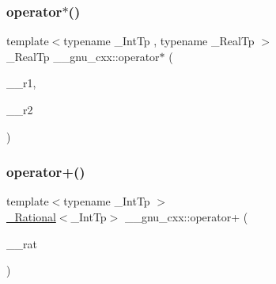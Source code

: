 \subsubsection{\texorpdfstring{operator$\ast$()}{operator*()}\hspace{0.1cm}{\footnotesize\ttfamily [3/3]}}
{\footnotesize\ttfamily template$<$typename \+\_\+\+Int\+Tp , typename \+\_\+\+Real\+Tp $>$ \\
\+\_\+\+Real\+Tp \+\_\+\+\_\+gnu\+\_\+cxx\+::operator$\ast$ (\begin{DoxyParamCaption}\item[{const \hyperlink{class____gnu__cxx_1_1__Rational}{\+\_\+\+Rational}$<$ \+\_\+\+Int\+Tp $>$ \&}]{\+\_\+\+\_\+r1,  }\item[{\+\_\+\+Real\+Tp}]{\+\_\+\+\_\+r2 }\end{DoxyParamCaption})}

\mbox{\label{namespace____gnu__cxx_a047fc1104d5de077fecb75d5917ad254}} 
\subsubsection{\texorpdfstring{operator+()}{operator+()}\hspace{0.1cm}{\footnotesize\ttfamily [1/4]}}
{\footnotesize\ttfamily template$<$typename \+\_\+\+Int\+Tp $>$ \\
\hyperlink{class____gnu__cxx_1_1__Rational}{\+\_\+\+Rational}$<$\+\_\+\+Int\+Tp$>$ \+\_\+\+\_\+gnu\+\_\+cxx\+::operator+ (\begin{DoxyParamCaption}\item[{const \hyperlink{class____gnu__cxx_1_1__Rational}{\+\_\+\+Rational}$<$ \+\_\+\+Int\+Tp $>$ \&}]{\+\_\+\+\_\+rat }\end{DoxyParamCaption})\hspace{0.3cm}{\ttfamily [inline]}}

\mbox{\label{namespace____gnu__cxx_add43b0fd2150bab3eceee13e6af6d54f}} 

